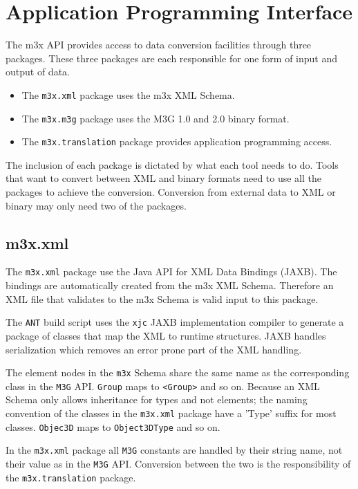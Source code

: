 \chapter{Application Programming Interface}
The m3x API provides access to data conversion facilities through three packages.
These three packages are each responsible for one form of input and output of data.
\begin{itemize}
\item The \texttt{m3x.xml} package uses the m3x XML Schema.
\item The \texttt{m3x.m3g} package uses the M3G 1.0 and 2.0 binary format.
\item The \texttt{m3x.translation} package provides application programming access.
\end{itemize}

The inclusion of each package is dictated by what each tool needs to do. Tools that want to convert between XML and binary formats need to use all the packages to achieve the conversion. Conversion from external data to XML or binary may only need two of the packages.


\section{m3x.xml}
The \texttt{m3x.xml} package use the Java API for XML Data Bindings (JAXB). The bindings are automatically created from the m3x XML Schema. Therefore an XML file that validates to the m3x Schema is valid input to this package.

The \texttt{ANT} build script uses the \texttt{xjc} JAXB implementation compiler to generate a package of classes that map the XML to runtime structures. JAXB handles serialization which removes an error prone part of the XML handling.

The element nodes in the \texttt{m3x} Schema share the same name as the corresponding class in the \texttt{M3G} API. \texttt{Group} maps to \texttt{<Group>} and so on.
Because an XML Schema only allows inheritance for types and not elements; the naming convention of the classes in the \texttt{m3x.xml} package have a 'Type' suffix for most classes. \texttt{Objec3D} maps to \texttt{Object3DType} and so on.

In the \texttt{m3x.xml} package all \texttt{M3G} constants are handled by their string name, not their value as in the \texttt{M3G} API. Conversion between the two is the responsibility of the \texttt{m3x.translation} package.

